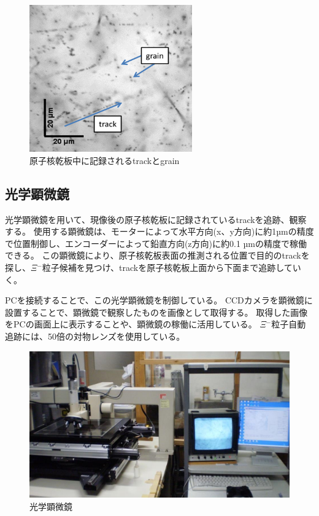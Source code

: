 \documentclass[12pt,a4paper]{jarticle}
\begin{document}
\begin{figure}[htbp]
 \centering
      \includegraphics[width=70mm]{grainfog.png}
 \caption{原子核乾板中に記録されるtrackとgrain\label{fig:grain_track}}
\end{figure}
\subsection{光学顕微鏡}
光学顕微鏡を用いて、現像後の原子核乾板に記録されているtrackを追跡、観察する。
使用する顕微鏡は、モーターによって水平方向(x、y方向)に約1µmの精度で位置制御し、エンコーダーによって鉛直方向(z方向)に約0.1 µmの精度で稼働できる。
この顕微鏡により、原子核乾板表面の推測される位置で目的のtrackを探し、$\Xi$$^-$粒子候補を見つけ、trackを原子核乾板上面から下面まで追跡していく。
\par
PCを接続することで、この光学顕微鏡を制御している。
CCDカメラを顕微鏡に設置することで、顕微鏡で観察したものを画像として取得する。
取得した画像をPCの画面上に表示することや、顕微鏡の稼働に活用している。
$\Xi$$^-$粒子自動追跡には、50倍の対物レンズを使用している。
\begin{figure}[htbp]
  \centering
     \includegraphics[width=140mm]{microscope.png}
  \caption{光学顕微鏡\label{fig:microscope}}
\end{figure}
\newpage
\end{document}
